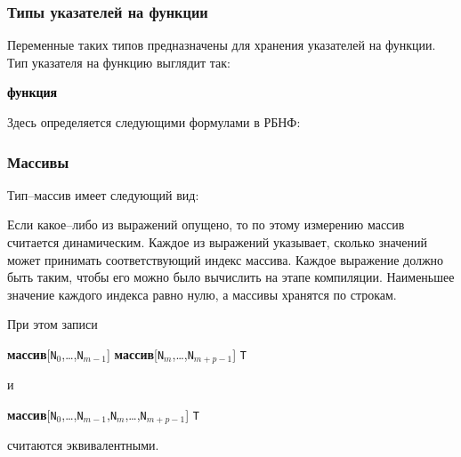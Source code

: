 \documentclass[10pt]{report}
\begin{document}
        \subsubsection{Типы указателей на функции}

Переменные таких типов предназначены для хранения указателей на функции. Тип указателя на функцию выглядит так:
\begin{center}
\noindent\textcolor{Green}{\textcolor{Black}{\textbf{функция}}  }
\end{center}

Здесь \textcolor{Green}{} определяется следующими формулами в РБНФ:

\textcolor{Green}{}

        \subsubsection{Массивы}
Тип--массив имеет следующий вид:
\begin{center}
\noindent\textcolor{Green}{}
\end{center}


Если какое--либо из выражений опущено, то по этому измерению массив считается динамическим. Каждое из выражений указывает, сколько значений может принимать соответствующий
индекс массива. Каждое выражение должно быть таким, чтобы его можно было вычислить на этапе компиляции. Наименьшее значение каждого индекса равно нулю, а массивы хранятся по
строкам.

При этом записи
\begin{center}
\textbf{массив}[\texttt{N}$_0$,\dots,\texttt{N}$_{m-1}$] \textbf{массив}[\texttt{N}$_{m}$,\dots,\texttt{N}$_{m+p-1}$] \texttt{T}
\end{center}
и
\begin{center}
\textbf{массив}[\texttt{N}$_0$,\dots,\texttt{N}$_{m-1}$,\texttt{N}$_{m}$,\dots,\texttt{N}$_{m+p-1}$] \texttt{T}
\end{center}
считаются эквивалентными.
\end{document}
